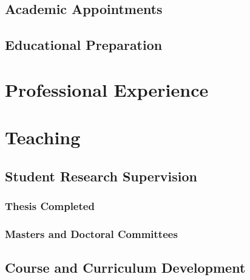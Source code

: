 \documentclass[11 pt]{rpibio}
\begin{document}


\subsection{Academic Appointments}


\subsection{Educational Preparation}



\section{Professional Experience}



\section{Teaching}


\subsection{Student Research Supervision}

 
\subsubsection{Thesis Completed}








\subsubsection{Masters and Doctoral Committees}


%


\subsection{Course and Curriculum Development}

\end{document}
